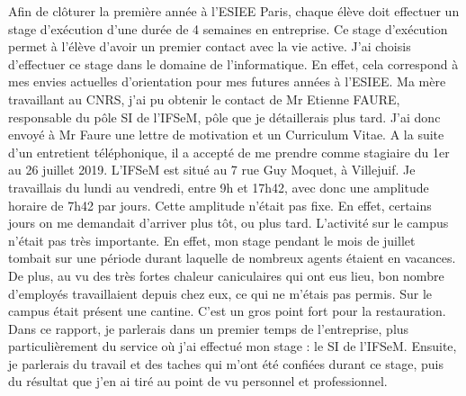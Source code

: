Afin de clôturer la première année à l'ESIEE Paris, chaque élève doit effectuer un stage d'exécution d'une durée de 4 semaines en entreprise. Ce stage d’exécution permet à l’élève d’avoir un premier contact avec la vie active. 
J'ai choisis d'effectuer ce stage dans le domaine de l'informatique. En effet, cela correspond à mes envies actuelles d'orientation pour mes futures années à l'ESIEE. Ma mère travaillant au CNRS, j'ai pu obtenir le contact de Mr Etienne FAURE, responsable du pôle SI de l'IFSeM\footnotemark, pôle que je détaillerais plus tard. J'ai donc envoyé à Mr Faure une lettre de motivation et un Curriculum Vitae. A la suite d'un entretient téléphonique, il a accepté de me prendre comme stagiaire du 1er au 26 juillet 2019. 
L'IFSeM est situé au 7 rue Guy Moquet, à Villejuif. Je travaillais du lundi au vendredi, entre 9h et 17h42, avec donc une amplitude horaire de 7h42 par jours. Cette amplitude n'était pas fixe. En effet, certains jours on me demandait d'arriver plus tôt, ou plus tard. 
\medbreak
L'activité sur le campus n'était pas très importante. En effet, mon stage pendant le mois de juillet tombait sur une période durant laquelle de nombreux agents étaient en vacances. De plus, au vu des très fortes chaleur caniculaires qui ont eus lieu, bon nombre d'employés travaillaient depuis chez eux, ce qui ne m'étais pas permis. Sur le campus était présent une cantine. C'est un gros point fort pour la restauration.
\medbreak
Dans ce rapport, je parlerais dans un premier temps de l'entreprise, plus particulièrement du service où j'ai effectué mon stage : le SI de l'IFSeM. Ensuite, je parlerais du travail et des taches qui m'ont été confiées durant ce stage, puis du résultat que j'en ai tiré au point de vu personnel et professionnel. 